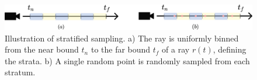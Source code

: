 \begin{figure}[h]
    \centering
    \includegraphics[width=1.0\textwidth]{figures/stratified-sampling.png}
    \caption[Stratified sampling]{Illustration of stratified sampling. a) The ray is uniformly binned from the near bound $t_n$ to the far bound $t_f$ of a ray $r(t)$, defining the strata. b) A single random point is randomly sampled from each stratum.}
    \label{fig:stratified-sampling}
\end{figure}